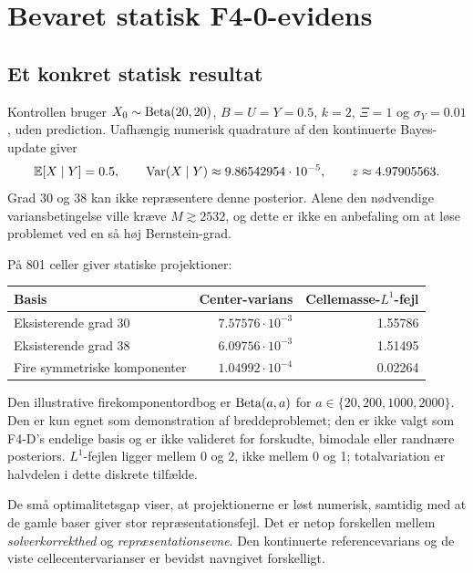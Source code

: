 \section{Bevaret statisk F4-0-evidens}
\subsection{Et konkret statisk resultat}
Kontrollen bruger \(X_0\sim\operatorname{Beta}(20,20)\), \(B=U=Y=0.5\), \(k=2\), \(\Xi=1\) og \(\sigma_Y=0.01\), uden prediction. Uafhængig numerisk quadrature af den kontinuerte Bayes-update giver
\begin{equation}
 \mathbb E[X\mid Y]=0.5,\qquad
 \operatorname{Var}(X\mid Y)\approx9.86542954\cdot10^{-5},\qquad z\approx4.97905563.
 \label{eq:preparationresult}
\end{equation}
Grad 30 og 38 kan ikke repræsentere denne posterior. Alene den nødvendige variansbetingelse ville kræve \(M\gtrsim2532\), og dette er ikke en anbefaling om at løse problemet ved en så høj Bernstein-grad.

På 801 celler giver statiske projektioner:
\begin{center}
\begin{tabular}{@{}lrr@{}}
\toprule
Basis & Center-varians & Cellemasse-\(L^1\)-fejl\\\midrule
Eksisterende grad 30 & \(7.57576\cdot10^{-3}\) & 1.55786\\
Eksisterende grad 38 & \(6.09756\cdot10^{-3}\) & 1.51495\\
Fire symmetriske komponenter & \(1.04992\cdot10^{-4}\) & 0.02264\\\bottomrule
\end{tabular}
\end{center}
Den illustrative firekomponentordbog er \(\operatorname{Beta}(a,a)\) for \(a\in\{20,200,1000,2000\}\). Den er kun egnet som demonstration af breddeproblemet; den er ikke valgt som F4-D's endelige basis og er ikke valideret for forskudte, bimodale eller randnære posteriors. \(L^1\)-fejlen ligger mellem 0 og 2, ikke mellem 0 og 1; totalvariation er halvdelen i dette diskrete tilfælde.

De små optimalitetsgap viser, at projektionerne er løst numerisk, samtidig med at de gamle baser giver stor repræsentationsfejl. Det er netop forskellen mellem \emph{solverkorrekthed} og \emph{repræsentationsevne}. Den kontinuerte referencevarians og de viste cellecentervarianser er bevidst navngivet forskelligt.

